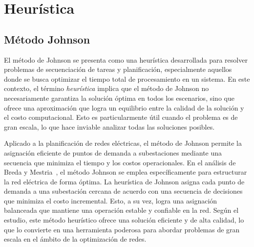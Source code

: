 \documentclass[9pt,a4paper,twoside]{rho-class/rho}
\begin{document}
    \section{Heurística}
        \subsection{Método Johnson}
            El método de Johnson se presenta como una heurística desarrollada para resolver problemas de secuenciación de tareas y planificación, especialmente aquellos donde se busca optimizar el tiempo total de procesamiento en un sistema. En este contexto, el término \textit{heurística} implica que el método de Johnson no necesariamente garantiza la solución óptima en todos los escenarios, sino que ofrece una aproximación que logra un equilibrio entre la calidad de la solución y el costo computacional. Esto es particularmente útil cuando el problema es de gran escala, lo que hace inviable analizar todas las soluciones posibles.
            \par\medskip            
            Aplicado a la planificación de redes eléctricas, el método de Johnson permite la asignación eficiente de puntos de demanda a subestaciones mediante una secuencia que minimiza el tiempo y los costos operacionales. En el análisis de Breda y Mestria~\cite{Breda2023}, el método Johnson se emplea específicamente para estructurar la red eléctrica de forma óptima. La heurística de Johnson asigna cada punto de demanda a una subestación cercana de acuerdo con una secuencia de decisiones que minimiza el costo incremental. Esto, a su vez, logra una asignación balanceada que mantiene una operación estable y confiable en la red. Según el estudio, este método heurístico ofrece una solución eficiente y de alta calidad, lo que lo convierte en una herramienta poderosa para abordar problemas de gran escala en el ámbito de la optimización de redes.
\end{document}
